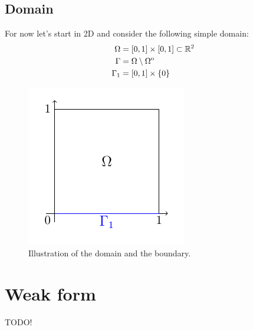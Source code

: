 \documentclass[
12pt,
a4paper,
onecolumn,
portrait
]{article}
\begin{document}
\subsection{Domain}
For now let's start in 2D and consider the following simple domain:
\begin{align*}
\Omega &= [0, 1] \times [0, 1] \subset \mathbb{R}^{2} \\
\Gamma &= \Omega \setminus {\kern0pt\Omega}^{\mathrm{o}} \\
\Gamma_1 &= [0, 1] \times \{0\}
\end{align*}
\begin{figure}[h]
\centering
\includegraphics[scale=1.5]{../graphics/domain.pdf}
\caption{Illustration of the domain and the boundary.}
\label{fig:domain-simple}
\end{figure}


\section{Weak form}
TODO!

\newpage
\renewcommand{\refname}{Reference} %

\nocite{tritton2012physical}




\end{document}
